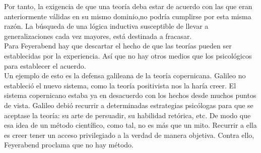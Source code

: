 \documentclass[a4paper, 11pt, twocolumn, spanish]{article}
\begin{document}
Por tanto, la exigencia de que una teoría deba estar de acuerdo con
las que eran anteriormente válidas en su mismo dominio,no podría
cumplirse por esta misma razón. La búsqueda de una lógica inductiva
susceptible de llevar a generalizaciones cada vez mayores, está
destinada a fracasar.\\[0pt]
Para Feyerabend hay que descartar el hecho de que las teorías pueden
ser establecidas por la experiencia. Así que no hay otros medios que
los psicológicos para establecer el acuerdo.\\[0pt]
Un ejemplo de esto es la defensa galileana de la teoría
copernicana. Galileo no estableció el nuevo sistema, como la teoría
positivista nos la haría creer. El sistema copernicano estaba ya en
desacuerdo con los hechos desde muchos puntos de vista. Galileo debió
recurrir a determinadas estrategias psicólogas para que se aceptase la
teoría: su arte de persuadir, su habilidad retórica, etc. De modo que
esa idea de un método científico, como tal, no es más que un
mito. Recurrir a ella es creer tener un acceso privilegiado a la
verdad de manera objetiva. Contra ello, Feyerabend proclama que no hay
método.
\end{document}
